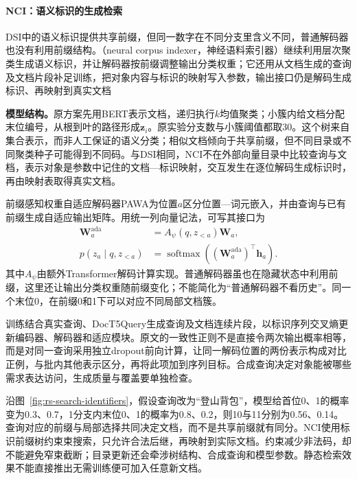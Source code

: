 \Needspace{155mm}
\paragraph{NCI：语义标识的生成检索}
\label{sec:rs-search-nci}

DSI中的语义标识提供共享前缀，但同一数字在不同分支里含义不同，普通解码器也没有利用前缀结构。（neural corpus indexer，神经语料索引器）继续利用层次聚类生成语义标识，并让解码器按前缀调整输出分类权重；它还用从文档生成的查询及文档片段补足训练，把对象内容与标识的映射写入参数，输出接口仍是解码生成标识、再映射到真实文档

\textbf{模型结构。}原方案先用BERT表示文档，递归执行$k$均值聚类；小簇内给文档分配末位编号，从根到叶的路径形成$\bm z_i$。原实验分支数与小簇阈值都取30。这个树来自集合表示，而非人工保证的语义分类；相似文档倾向于共享前缀，但不同目录或不同聚类种子可能得到不同码。与DSI相同，NCI不在外部向量目录中比较查询与文档，表示对象是参数中记住的文档—标识映射，交互发生在逐位解码生成标识时，再由映射表取得真实文档。

前缀感知权重自适应解码器PAWA为位置$a$区分位置—词元嵌入，并由查询与已有前缀生成自适应输出矩阵。用统一列向量记法，可写其接口为
\begin{equation}
 \begin{split}
 \bm W_a^{\mathrm{ada}}&=A_\psi(q,z_{<a})\bm W_a,\\
 p(z_a\mid q,z_{<a})
 &=\operatorname{softmax}((\bm W_a^{\mathrm{ada}})^\top\bm h_a).
 \end{split}
 \label{eq:rs-search-nci-pawa}
\end{equation}
其中$A_\psi$由额外Transformer解码计算实现。普通解码器虽也在隐藏状态中利用前缀，这里还让输出分类权重随前缀变化；不能简化为“普通解码器不看历史”。同一个末位0，在前缀0和1下可以对应不同局部文档簇。

训练结合真实查询、DocT5Query生成查询及文档连续片段，以标识序列交叉熵更新编码器、解码器和适应模块。原文的一致性正则不是直接令两次输出概率相等，而是对同一查询采用独立dropout前向计算，让同一解码位置的两份表示构成对比正例，与批内其他表示区分，再将此项加到序列目标。合成查询决定对象能被哪些需求表达访问，生成质量与覆盖要单独检查。

沿图~\ref{fig:rs-search-identifiers}，假设查询改为“登山背包”，模型给首位0、1的概率变为0.3、0.7，1分支内末位0、1的概率为0.8、0.2，则10与11分别为0.56、0.14。查询对应的前缀与局部选择共同决定文档，而不是共享前缀就有同分。NCI使用标识前缀树约束束搜索，只允许合法后继，再映射到实际文档。约束减少非法码，却不能避免窄束截断；目录更新还会牵涉树结构、合成查询和模型参数。静态检索效果不能直接推出无需训练便可加入任意新文档。

